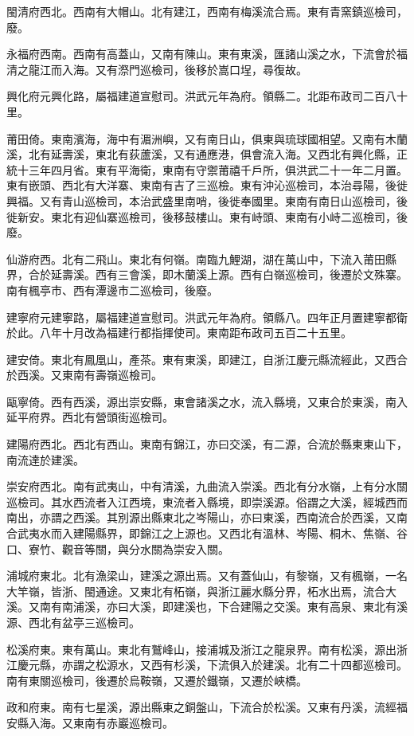閩清府西北。西南有大帽山。北有建江，西南有梅溪流合焉。東有青窯鎮巡檢司，廢。

永福府西南。西南有高蓋山，又南有陳山。東有東溪，匯諸山溪之水，下流會於福清之龍江而入海。又有漈門巡檢司，後移於嵩口埕，尋復故。

興化府元興化路，屬福建道宣慰司。洪武元年為府。領縣二。北距布政司二百八十里。

莆田倚。東南濱海，海中有湄洲嶼，又有南日山，俱東與琉球國相望。又南有木蘭溪，北有延壽溪，東北有荻蘆溪，又有通應港，俱會流入海。又西北有興化縣，正統十三年四月省。東有平海衛，東南有守禦莆禧千戶所，俱洪武二十一年二月置。東有嵌頭、西北有大洋寨、東南有吉了三巡檢。東有沖沁巡檢司，本治尋陽，後徙興福。又有青山巡檢司，本治武盛里南哨，後徙奉國里。東南有南日山巡檢司，後徙新安。東北有迎仙寨巡檢司，後移鼓樓山。東有峙頭、東南有小峙二巡檢司，後廢。

仙游府西。北有二飛山。東北有何嶺。南臨九鯉湖，湖在萬山中，下流入莆田縣界，合於延壽溪。西有三會溪，即木蘭溪上源。西有白嶺巡檢司，後遷於文殊寨。南有楓亭市、西有潭邊市二巡檢司，後廢。

建寧府元建寧路，屬福建道宣慰司。洪武元年為府。領縣八。四年正月置建寧都衛於此。八年十月改為福建行都指揮使司。東南距布政司五百二十五里。

建安倚。東北有鳳凰山，產茶。東有東溪，即建江，自浙江慶元縣流經此，又西合於西溪。又東南有壽嶺巡檢司。

甌寧倚。西有西溪，源出崇安縣，東會諸溪之水，流入縣境，又東合於東溪，南入延平府界。西北有營頭街巡檢司。

建陽府西北。西北有西山。東南有錦江，亦曰交溪，有二源，合流於縣東東山下，南流達於建溪。

崇安府西北。南有武夷山，中有清溪，九曲流入崇溪。西北有分水嶺，上有分水關巡檢司。其水西流者入江西境，東流者入縣境，即崇溪源。俗謂之大溪，經城西而南出，亦謂之西溪。其別源出縣東北之岑陽山，亦曰東溪，西南流合於西溪，又南合武夷水而入建陽縣界，即錦江之上源也。又西北有溫林、岑陽、桐木、焦嶺、谷口、寮竹、觀音等關，與分水關為崇安入關。

浦城府東北。北有漁梁山，建溪之源出焉。又有蓋仙山，有黎嶺，又有楓嶺，一名大竿嶺，皆浙、閩通途。又東北有柘嶺，與浙江麗水縣分界，柘水出焉，流合大溪。又南有南浦溪，亦曰大溪，即建溪也，下合建陽之交溪。東有高泉、東北有溪源、西北有盆亭三巡檢司。

松溪府東。東有萬山。東北有鷲峰山，接浦城及浙江之龍泉界。南有松溪，源出浙江慶元縣，亦謂之松源水，又西有杉溪，下流俱入於建溪。北有二十四都巡檢司。南有東關巡檢司，後遷於烏鞍嶺，又遷於鐵嶺，又遷於峽橋。

政和府東。南有七星溪，源出縣東之銅盤山，下流合於松溪。又東有丹溪，流經福安縣入海。又東南有赤巖巡檢司。

